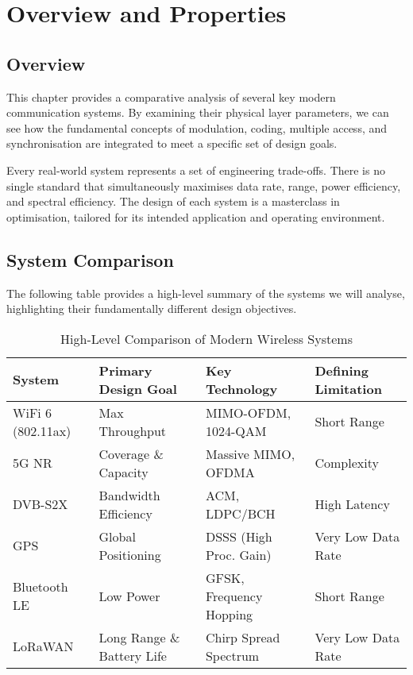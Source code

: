 \section{Overview and Properties}

\subsection{Overview}

This chapter provides a comparative analysis of several key modern communication systems. By examining their physical layer parameters, we can see how the fundamental concepts of modulation, coding, multiple access, and synchronisation are integrated to meet a specific set of design goals.

\begin{keyconcept}
    Every real-world system represents a set of engineering trade-offs. There is no single standard that simultaneously maximises data rate, range, power efficiency, and spectral efficiency. The design of each system is a masterclass in optimisation, tailored for its intended application and operating environment.
\end{keyconcept}


\subsection{System Comparison}

The following table provides a high-level summary of the systems we will analyse, highlighting their fundamentally different design objectives.

\begin{table}[H]
    \centering
    \caption{High-Level Comparison of Modern Wireless Systems}
    \label{tab:system-comparison}
    \begin{tabular}{@{}llll@{}}
        \toprule
        \tableheaderfont System & \tableheaderfont Primary Design Goal & \tableheaderfont Key Technology & \tableheaderfont Defining Limitation \\
        \midrule
        WiFi 6 (802.11ax) & Max Throughput & MIMO-OFDM, 1024-QAM & Short Range \\
        5G NR & Coverage \& Capacity & Massive MIMO, OFDMA & Complexity \\
        DVB-S2X & Bandwidth Efficiency & ACM, LDPC/BCH & High Latency \\
        GPS & Global Positioning & DSSS (High Proc. Gain) & Very Low Data Rate \\
        Bluetooth LE & Low Power & GFSK, Frequency Hopping & Short Range \\
        LoRaWAN & Long Range \& Battery Life & Chirp Spread Spectrum & Very Low Data Rate \\
        \bottomrule
    \end{tabular}
\end{table}


